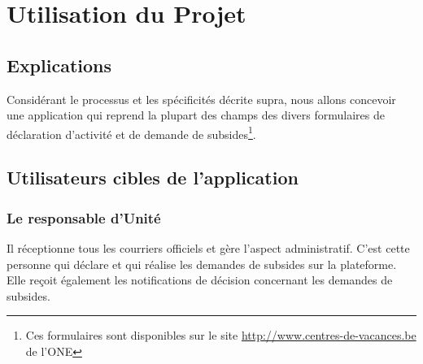 \section{Utilisation du Projet}
\subsection{Explications}
Considérant le processus et les spécificités décrite supra, nous allons concevoir une application qui reprend la plupart des champs des divers formulaires de déclaration d'activité et de demande de subsides\footnote{Ces formulaires sont disponibles sur le site \url{http://www.centres-de-vacances.be} de l'ONE}. 






\subsection{Utilisateurs cibles de l'application}

\subsubsection{Le responsable d'Unité} Il réceptionne tous les courriers officiels et gère l'aspect administratif. C'est cette personne qui déclare et qui réalise les demandes de subsides sur la plateforme. Elle reçoit également les notifications de décision concernant les demandes de subsides. 

